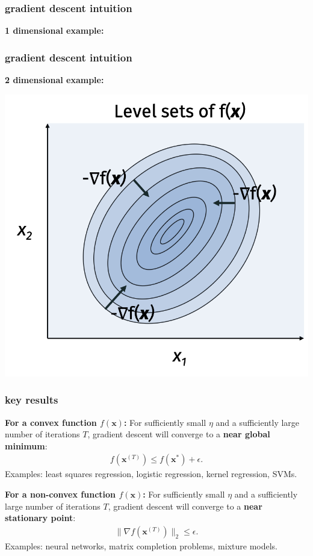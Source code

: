 \documentclass[compress]{beamer}
\newcommand{\bv}[1]{\mathbf{#1}}
\begin{document}
\begin{frame}[t]
	\frametitle{gradient descent intuition}
	\textbf{1 dimensional example:}
\end{frame}

\begin{frame}[t]
	\frametitle{gradient descent intuition}
	\textbf{2 dimensional example:}
	\begin{center}
		\includegraphics[width=.7\textwidth]{2d_example.png}
	\end{center}
\end{frame}

\begin{frame}[t]
	\frametitle{key results}
	\textbf{For a convex function $f(\bv{x})$:}
	For sufficiently small $\eta$ and a sufficiently large number of iterations $T$, gradient descent will converge to a \alert{\textbf{near global minimum}}:
	\begin{align*}
		f(\bv{x}^{(T)}) \leq  f(\bv{x}^{*}) + \epsilon.  
	\end{align*}
	Examples: least squares regression, logistic regression, kernel regression, SVMs.
	
	\textbf{For a non-convex function $f(\bv{x})$:}
	For sufficiently small $\eta$ and  a sufficiently large number of iterations $T$, gradient descent will converge to a \alert{\textbf{near stationary point}}:
	\begin{align*}
		\|\nabla f(\bv{x}^{(T)})\|_2 \leq  \epsilon.  
	\end{align*}
	Examples: neural networks, matrix completion problems, mixture models. 	
\end{frame}
\end{document}
